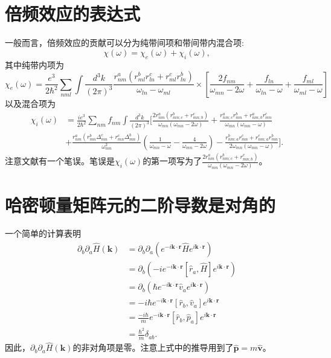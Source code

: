\chapter{倍频效应的表达式}\label{sec:expression-of-second}

一般而言，倍频效应的贡献可以分为纯带间项和带间带内混合项\cite{rashkeev_efficient_1998}:
\[
\chi(\omega)=\chi_{e}(\omega)+\chi_{i}(\omega),
\]
其中纯带内项为
\[
\chi_{e}(\omega)=\frac{e^{3}}{2\hbar^{2}}\sum_{nml}\int\frac{d^{3}k}{(2\pi)^{3}}\frac{r_{nm}^{a}(r_{ml}^{b}r_{ln}^{c}+r_{ml}^{c}r_{ln}^{b})}{\omega_{ln}-\omega_{ml}}\times[\frac{2f_{nm}}{\omega_{mn}-2\omega}+\frac{f_{ln}}{\omega_{ln}-\omega}+\frac{f_{ml}}{\omega_{ml}-\omega}]
\]
以及混合项为
\begin{align*}
\chi_{i}(\omega) & =\frac{ie^{3}}{2\hbar^{2}}\sum_{nm}f_{nm}\int\frac{d^{3}k}{(2\pi)^{3}}[\frac{2r_{nm}^{a}(r_{mn;c}^{b}+r_{mn;b}^{c})}{\omega_{mn}(\omega_{mn}-2\omega)}+\frac{r_{nm;c}^{a}r_{mn}^{b}+r_{nm;b}^{a}r_{mn}^{c}}{\omega_{mn}(\omega_{mn}-\omega)}\\
    & +\frac{r_{nm}^{a}(r_{mn}^{b}\Delta_{mn}^{c}+r_{mn}^{c}\Delta_{mn}^{b})}{\omega_{mn}^{2}}(\frac{1}{\omega_{mn}-\omega}-\frac{4}{\omega_{mn}-2\omega})-\frac{r_{nm;a}^{b}r_{mn}^{c}+r_{nm;a}^{c}r_{mn}^{b}}{2\omega_{mn}(\omega_{mn}-\omega)}].
\end{align*}
注意文献有一个笔误。笔误是$\chi_{i}(\omega)$的第一项写为了$\frac{2r_{nm}^{a}(r_{nm;c}^{b}+r_{mn;b}^{c})}{\omega_{mn}(\omega_{mn}-2\omega)}$。

\chapter{哈密顿量矩阵元的二阶导数是对角的}\label{sec:Proving-Second-Order}

一个简单的计算表明
\begin{align*}
\partial_{b}\partial_{a}\hat{H}(\mathbf{k}) & =\partial_{b}\partial_{a}(e^{-i\mathbf{k}\cdot\mathbf{r}}\hat{H}e^{i\mathbf{k}\cdot\mathbf{r}})\\
    & =\partial_{b}(-ie^{-i\mathbf{k}\cdot\mathbf{r}}[\hat{r}_{a},\hat{H}]e^{i\mathbf{k}\cdot\mathbf{r}})\\
    & =\partial_{b}(\hbar e^{-i\mathbf{k}\cdot\mathbf{r}}\hat{v}_{a}e^{i\mathbf{k}\cdot\mathbf{r}})\\
    & =-i\hbar e^{-i\mathbf{k}\cdot\mathbf{r}}[\hat{r}_{b},\hat{v}_{a}]e^{i\mathbf{k}\cdot\mathbf{r}}\\
    & =\frac{-i\hbar}{m}e^{-i\mathbf{k}\cdot\mathbf{r}}[\hat{r}_{b},\hat{p}_{a}]e^{i\mathbf{k}\cdot\mathbf{r}}\\
    & =\frac{\hbar^{2}}{m}\delta_{ab}.
\end{align*}
因此，$\partial_{b}\partial_{a}\hat{H}(\mathbf{k})$的非对角项是零。注意上式中的推导用到了$\hat{\mathbf{p}}=m\hat{\mathbf{v}}$。


